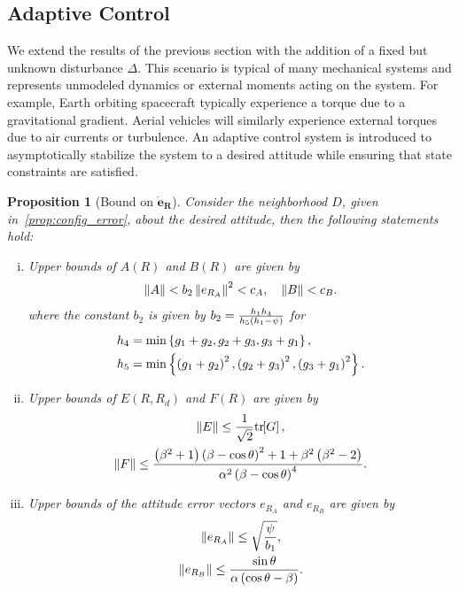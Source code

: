 \documentclass[10pt,fleqn]{IJCAS}  %
\newtheorem{prop}{Proposition}
\begin{document}
\begin{multicols}{2}
\subsection{Adaptive Control}
We extend the results of the previous section with the addition of a fixed but unknown disturbance \( \Delta \).
This scenario is typical of many mechanical systems and represents unmodeled dynamics or external moments acting on the system.
For example, Earth orbiting spacecraft typically experience a torque due to a gravitational gradient.
Aerial vehicles will similarly experience external torques due to air currents or turbulence.
An adaptive control system is introduced to asymptotically stabilize the system to a desired attitude while ensuring that state constraints are satisfied. %

\begin{prop}[Bound on \( \bm{\dot{e}_R} \)]\label{prop:eR_dot_bound}
Consider the neighborhood \( D \), given in~\cref{prop:config_error}, about the desired attitude, then the following statements hold:
\begin{enumerate}[(i)]
	\item \label{item:prop_eR_dot_bound_AB} Upper bounds of \( A(R) \) and \( B(R) \) are given by
	\begin{gather}
		\left\| A \right\| < b_2 \left\| e_{R_A} \right\|^2 < c_A  , \quad \left\| B \right\| < c_B . \label{eqn:AB_bound}
	\end{gather}
  where the constant \( b_2\) is given by \( b_2 = \frac{h_1 h_4}{h_5 \left( h_1 - \psi \right)}\) for
  \begin{align*}
    h_4 &= \min\left\{ g_1 + g_2, g_2 + g_3 , g_3 + g_1 \right\} ,\\
    h_5 &= \min\left\{ \left( g_1 + g_2 \right)^2,\left( g_2 + g_3 \right)^2 , \left( g_3 + g_1 \right)^2 \right\} .\\
  \end{align*}
	\item \label{item:prop_eR_dot_bound_EF} Upper bounds of \( E(R,R_d) \) and \( F(R) \) are given by
	\begin{gather}
		\left\| E \right\| \leq \frac{1}{\sqrt{2}} \mathrm{tr}\negthickspace\left[ G \right]  , \label{eqn:E_bound} \\
		\left\| F \right\| \leq \frac{\left( \beta^2 + 1 \right)\left( \beta - \cos \theta \right)^2 + 1 + \beta^2 \left( \beta^2-2 \right)}{\alpha^2 \left( \beta-\cos \theta \right)^4} . \label{eqn:F_bound}
	\end{gather}
	\item Upper bounds of the attitude error vectors \( e_{R_A} \) and \( e_{R_B} \) are given by
	\begin{gather}
		\left\| e_{R_A} \right\| \leq \sqrt{\frac{\psi}{b_1}}, \label{eqn:eRA_bound} \\
		\left\| e_{R_B} \right\| \leq \frac{\sin\theta}{\alpha \left( \cos \theta - \beta \right)}. \label{eqn:eRB_bound}
	\end{gather}


\end{enumerate}
\end{prop}
\end{multicols}
\end{document}
